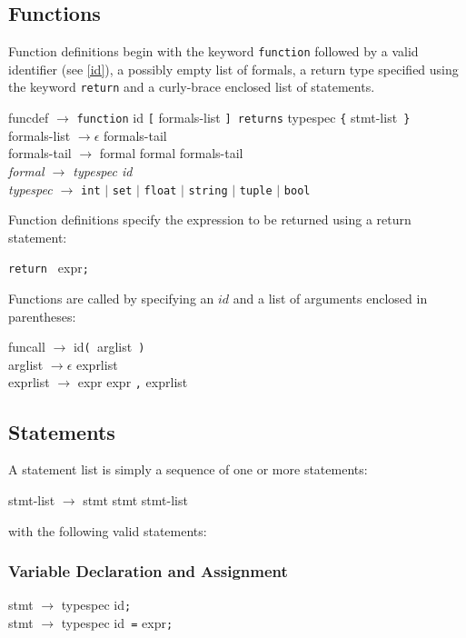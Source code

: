 \subsection{Functions}
Function definitions begin with the keyword \verb|function| followed by a valid identifier (see \ref{id}), a possibly empty list of formals, a return type specified using the keyword \verb|return| and a curly-brace enclosed list of statements.
\begin{grammar}
funcdef $\to$ \verb|function| id \verb|[| formals-list \verb|] returns| typespec \verb|{| stmt-list\verb| }|\\
formals-list $\to \epsilon$ \OR formals-tail\\
formals-tail $\to$ formal \OR formal formals-tail\\
\textit{formal $\to$ typespec id}\\
\textit{typespec $\to$} \verb|int| $\vert$ \verb|set| $\vert$ \verb|float| $\vert$ \verb|string| $\vert$ \verb|tuple| $\vert$ \verb|bool|
\end{grammar}
Function definitions specify the expression to be returned using a return statement:
\begin{grammar}
\verb|return | expr\verb|;|
\end{grammar}
Functions are called by specifying an $id$ and a list of arguments enclosed in parentheses:
\begin{grammar}
funcall $\to$ id\verb|( |arglist\verb| )|\\
arglist $\to \epsilon$ \OR exprlist\\
exprlist $\to$ expr \OR expr \verb|,| exprlist
\end{grammar}

\subsection{Statements}
A statement list is simply a sequence of one or more statements:
\begin{grammar}
stmt-list $\to$ stmt \OR stmt stmt-list
\end{grammar}
with the following valid statements:
\subsubsection*{Variable Declaration and Assignment}
\begin{grammar}
stmt $\to$ typespec id\verb|;|\\
stmt $\to$ typespec id\verb| =| expr\verb|;|\\
\end{grammar}
